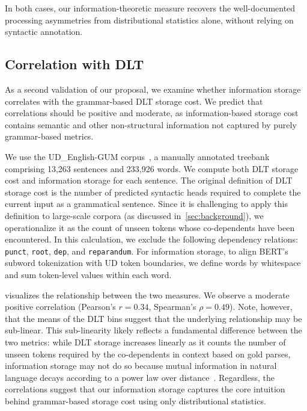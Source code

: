 \documentclass[11pt]{article}
\begin{document}
In both cases, our information-theoretic measure recovers the well-documented processing asymmetries from distributional statistics alone, without relying on syntactic annotation.



\subsection{Correlation with DLT}
\label{sec:correlation}

As a second validation of our proposal, we examine whether information storage correlates with the grammar-based DLT storage cost. 
We predict that correlations should be positive and moderate, as information-based storage cost contains semantic and other non-structural information not captured by purely grammar-based metrics.

We use the UD\_English-GUM corpus~\citep{Zeldes2017}, a manually annotated treebank comprising 13,263 sentences and 233,926 words.
We compute both DLT storage cost and information storage for each sentence.
The original definition of DLT storage cost is the number of predicted syntactic heads required to complete the current input as a grammatical sentence.
Since it is challenging to apply this definition to large-scale corpora (as discussed in~\cref{sec:background}), we operationalize it as the count of unseen tokens whose co-dependents have been encountered.
In this calculation, we exclude the following dependency relations: \texttt{punct}, \texttt{root}, \texttt{dep}, and \texttt{reparandum}.
For information storage, to align BERT's subword tokenization with UD token boundaries, we define words by whitespace and sum token-level values within each word.

 visualizes the relationship between the two measures.
We observe a moderate positive correlation (Pearson's $r = 0.34$, Spearman's $\rho = 0.49$). Note, however, that the means of the DLT bins suggest that the underlying relationship may be sub-linear.
This sub-linearity likely reflects a fundamental difference between the two metrics: while DLT storage increases linearly as it counts the number of unseen tokens required by the co-dependents in context based on gold parses, information storage may not do so because mutual information in natural language decays according to a power law over distance~\citep[e.g.,][]{debowski-2015,hahn-etal-2021}.
Regardless, the correlations suggest that our information storage captures the core intuition behind grammar-based storage cost using only distributional statistics.
\end{document}
